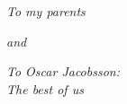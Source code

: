 
\begin{dedication} 

\textit{To my parents}

\vspace{5cm}
\textit{and}
\vspace{5cm}

\textit{To Oscar Jacobsson:\\The best of us}
\end{dedication}

